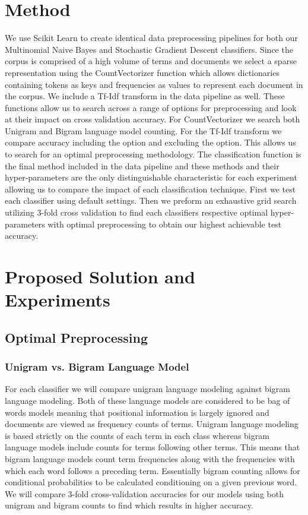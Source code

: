 \documentclass[a4paper, 12pt]{article}
\begin{document}
\section{Method}
We use \cite{pedregosa2011scikit} Scikit Learn to create identical data preprocessing pipelines for both our Multinomial Naive Bayes and Stochastic Gradient Descent classifiers.  Since the corpus is comprised of a high volume of terms and documents we select a sparse representation using the CountVectorizer function which allows dictionaries containing tokens as keys and frequencies as values to represent each document in the corpus. We include a Tf-Idf transform in the data pipeline as well. These functions allow us to search across a range of options for preprocessing and look at their impact on cross validation accuracy.  For CountVectorizer we search both Unigram and Bigram language model counting. For the Tf-Idf transform we compare accuracy including the option and excluding the option. This allows us to search for an optimal preprocessing methodology. The classification function is the final method included in the data pipeline and these methods and their hyper-parameters are the only distinguishable characteristic for each experiment allowing us to compare the impact of each classification technique. First we test each classifier using default settings. Then we preform an exhaustive grid search utilizing 3-fold cross validation to find each classifiers respective optimal hyper-parameters with optimal preprocessing to obtain our highest achievable test accuracy. \\

\section{Proposed Solution and Experiments}
\subsection{Optimal Preprocessing}
\subsubsection{Unigram vs. Bigram Language Model}
For each classifier we will compare unigram language modeling against bigram language modeling. Both of these language models are considered to be bag of words models meaning that positional information is largely ignored and documents are viewed as frequency counts of terms. Unigram language modeling is based strictly on the counts of each term in each class whereas bigram language models include counts for terms following other terms. This means that bigram language models count term frequencies along with the frequencies with which each word follows a preceding term. Essentially bigram counting allows for conditional probabilities to be calculated conditioning on a given previous word.  We will compare 3-fold cross-validation accuracies for our models using both unigram and bigram counts to find which results in higher accuracy.
\end{document}
